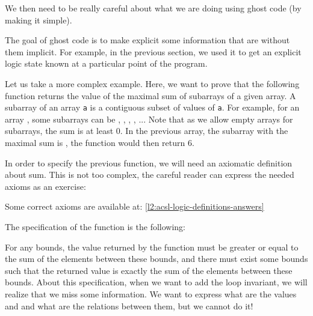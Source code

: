 We then need to be really careful about what we are doing using ghost
code (by making it simple).





The goal of ghost code is to make explicit some information that are
without them implicit. For example, in the previous section, we used it
to get an explicit logic state known at a particular point of the
program.

Let us take a more complex example. Here, we want to prove that the
following function returns the value of the maximal sum of subarrays of
a given array. A subarray of an array \texttt{a} is a contiguous subset
of values of \texttt{a}. For example, for an array ,
some subarrays can be
\CodeInline{\{\}}, , 
, , ... Note that as we allow
empty arrays for subarrays, the sum is at least 0. In the previous
array, the subarray with the maximal sum is ,
the function would then return 6.






In order to specify the previous function, we will need an axiomatic
definition about sum. This is not too complex, the careful reader
can express the needed axioms as an exercise:






Some correct axioms are available at: \ref{l2:acsl-logic-definitions-answers}



The specification of the function is the following:






For any bounds, the value returned by the function must be greater or
equal to the sum of the elements between these bounds, and there must
exist some bounds such that the returned value is exactly the sum of the
elements between these bounds. About this specification, when we want to
add the loop invariant, we will realize that we miss some information.
We want to express what are the values  and  and
what are the relations between them, but we cannot do it!

